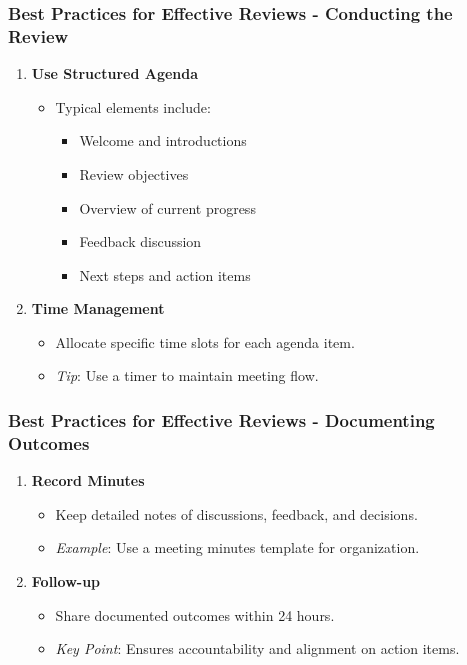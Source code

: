 \documentclass[aspectratio=169]{beamer}
\begin{document}
\begin{frame}[fragile]
    \frametitle{Best Practices for Effective Reviews - Conducting the Review}
    \begin{enumerate}
        \item \textbf{Use Structured Agenda}
            \begin{itemize}
                \item Typical elements include:
                    \begin{itemize}
                        \item Welcome and introductions
                        \item Review objectives
                        \item Overview of current progress
                        \item Feedback discussion
                        \item Next steps and action items
                    \end{itemize}
            \end{itemize}
            
        \item \textbf{Time Management}
            \begin{itemize}
                \item Allocate specific time slots for each agenda item.
                \item \textit{Tip}: Use a timer to maintain meeting flow.
            \end{itemize}
    \end{enumerate}
\end{frame}

\begin{frame}[fragile]
    \frametitle{Best Practices for Effective Reviews - Documenting Outcomes}
    \begin{enumerate}
        \item \textbf{Record Minutes}
            \begin{itemize}
                \item Keep detailed notes of discussions, feedback, and decisions.
                \item \textit{Example}: Use a meeting minutes template for organization.
            \end{itemize}

        \item \textbf{Follow-up}
            \begin{itemize}
                \item Share documented outcomes within 24 hours.
                \item \textit{Key Point}: Ensures accountability and alignment on action items.
            \end{itemize}
    \end{enumerate}
\end{frame}
\end{document}
